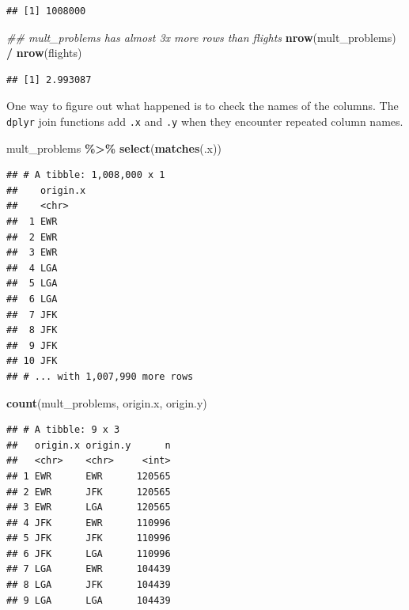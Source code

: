 \documentclass[
]{article}
\newenvironment{Shaded}{\begin{snugshade}}{\end{snugshade}}
\newcommand{\CommentTok}[1]{\textcolor[rgb]{0.56,0.35,0.01}{\textit{#1}}}
\newcommand{\KeywordTok}[1]{\textcolor[rgb]{0.13,0.29,0.53}{\textbf{#1}}}
\newcommand{\NormalTok}[1]{#1}
\newcommand{\OperatorTok}[1]{\textcolor[rgb]{0.81,0.36,0.00}{\textbf{#1}}}
\newcommand{\StringTok}[1]{\textcolor[rgb]{0.31,0.60,0.02}{#1}}
\begin{document}
\begin{verbatim}
## [1] 1008000
\end{verbatim}

\begin{Shaded}
\begin{Highlighting}[]
\CommentTok{\#\# \textasciigrave{}mult\_problems\textasciigrave{} has almost 3x more rows than \textasciigrave{}flights\textasciigrave{}}
\KeywordTok{nrow}\NormalTok{(mult\_problems) }\OperatorTok{/}\StringTok{ }\KeywordTok{nrow}\NormalTok{(flights)}
\end{Highlighting}
\end{Shaded}

\begin{verbatim}
## [1] 2.993087
\end{verbatim}

One way to figure out what happened is to check the names of the columns. The \texttt{dplyr} join functions add \texttt{.x} and \texttt{.y} when they encounter repeated column names.

\begin{Shaded}
\begin{Highlighting}[]
\NormalTok{mult\_problems }\OperatorTok{\%\textgreater{}\%}\StringTok{ }
\StringTok{    }\KeywordTok{select}\NormalTok{(}\KeywordTok{matches}\NormalTok{(}\StringTok{\textquotesingle{}.x\textquotesingle{}}\NormalTok{))}
\end{Highlighting}
\end{Shaded}

\begin{verbatim}
## # A tibble: 1,008,000 x 1
##    origin.x
##    <chr>   
##  1 EWR     
##  2 EWR     
##  3 EWR     
##  4 LGA     
##  5 LGA     
##  6 LGA     
##  7 JFK     
##  8 JFK     
##  9 JFK     
## 10 JFK     
## # ... with 1,007,990 more rows
\end{verbatim}

\begin{Shaded}
\begin{Highlighting}[]
\KeywordTok{count}\NormalTok{(mult\_problems, origin.x, origin.y)}
\end{Highlighting}
\end{Shaded}

\begin{verbatim}
## # A tibble: 9 x 3
##   origin.x origin.y      n
##   <chr>    <chr>     <int>
## 1 EWR      EWR      120565
## 2 EWR      JFK      120565
## 3 EWR      LGA      120565
## 4 JFK      EWR      110996
## 5 JFK      JFK      110996
## 6 JFK      LGA      110996
## 7 LGA      EWR      104439
## 8 LGA      JFK      104439
## 9 LGA      LGA      104439
\end{verbatim}
\end{document}
